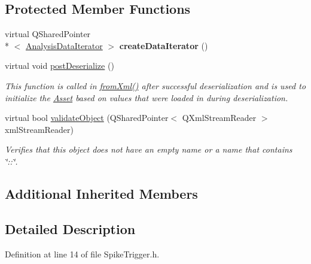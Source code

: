\subsection*{Protected Member Functions}
\begin{DoxyCompactItemize}
\item 
\hypertarget{class_picto_1_1_spike_trigger_a459a6d1ded26b5fab20c7fc9800f2678}{virtual Q\-Shared\-Pointer\\*
$<$ \hyperlink{class_picto_1_1_analysis_data_iterator}{Analysis\-Data\-Iterator} $>$ {\bfseries create\-Data\-Iterator} ()}\label{class_picto_1_1_spike_trigger_a459a6d1ded26b5fab20c7fc9800f2678}

\item 
virtual void \hyperlink{class_picto_1_1_spike_trigger_aeae85dbaa68d96406f5563db52a02967}{post\-Deserialize} ()
\begin{DoxyCompactList}\small\item\em This function is called in \hyperlink{class_picto_1_1_asset_a8bed4da09ecb1c07ce0dab313a9aba67}{from\-Xml()} after successful deserialization and is used to initialize the \hyperlink{class_picto_1_1_asset}{Asset} based on values that were loaded in during deserialization. \end{DoxyCompactList}\item 
\hypertarget{class_picto_1_1_spike_trigger_a89dba39ea8d5fcaf0ce39c0dbabda2ca}{virtual bool \hyperlink{class_picto_1_1_spike_trigger_a89dba39ea8d5fcaf0ce39c0dbabda2ca}{validate\-Object} (Q\-Shared\-Pointer$<$ Q\-Xml\-Stream\-Reader $>$ xml\-Stream\-Reader)}\label{class_picto_1_1_spike_trigger_a89dba39ea8d5fcaf0ce39c0dbabda2ca}

\begin{DoxyCompactList}\small\item\em Verifies that this object does not have an empty name or a name that contains \char`\"{}\-::\char`\"{}. \end{DoxyCompactList}\end{DoxyCompactItemize}
\subsection*{Additional Inherited Members}


\subsection{Detailed Description}


Definition at line 14 of file Spike\-Trigger.\-h.



